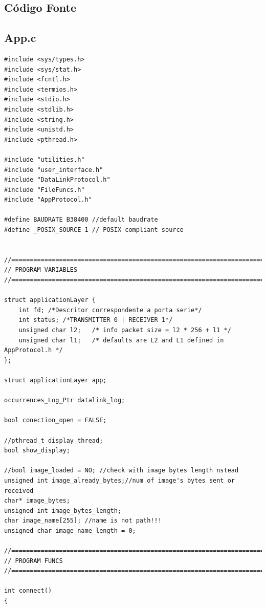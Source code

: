 \documentclass[11pt,a4paper,reqno]{report}
\numberwithin{equation}{section}
\begin{document}
\begin{appendices}

\chapter{Código Fonte}

\label{APPC}
\section{App.c}
\begin{lstlisting}
#include <sys/types.h>
#include <sys/stat.h>
#include <fcntl.h>
#include <termios.h>
#include <stdio.h>
#include <stdlib.h>
#include <string.h>
#include <unistd.h>
#include <pthread.h>

#include "utilities.h"
#include "user_interface.h"
#include "DataLinkProtocol.h"
#include "FileFuncs.h"
#include "AppProtocol.h"

#define BAUDRATE B38400 //default baudrate
#define _POSIX_SOURCE 1 // POSIX compliant source 


//=======================================================================
// PROGRAM VARIABLES
//=======================================================================

struct applicationLayer {
	int fd; /*Descritor correspondente a porta serie*/
	int status; /*TRANSMITTER 0 | RECEIVER 1*/
	unsigned char l2;	/* info packet size = l2 * 256 + l1 */
	unsigned char l1;	/* defaults are L2 and L1 defined in AppProtocol.h */	
};

struct applicationLayer app;

occurrences_Log_Ptr datalink_log;

bool conection_open = FALSE;

//pthread_t display_thread;
bool show_display;

//bool image_loaded = NO; //check with image bytes length nstead
unsigned int image_already_bytes;//num of image's bytes sent or received
char* image_bytes;
unsigned int image_bytes_length;
char image_name[255]; //name is not path!!!
unsigned char image_name_length = 0;

//=======================================================================
// PROGRAM FUNCS
//=======================================================================

int connect()
{


\end{lstlisting}
\end{appendices}
\end{document}
